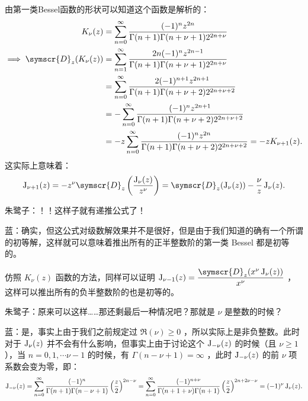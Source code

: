 由第一类Bessel函数的形状可以知道这个函数是解析的：
\[
	\begin{aligned}
		K_{\nu }(z)                           & = \sum_{n=0}^{\infty} \frac{(-1)^nz^{2n}}{\Gamma (n+1)\Gamma (n+\nu +1)2^{2n+\nu }}                        \\
		\implies\symscr{D} _z( K_{\nu }(z)  ) & =
		\sum_{n=1}^{\infty} \frac{2n(-1)^nz^{2n-1}}{\Gamma (n+1)\Gamma (n+\nu +1)2^{2n+\nu }}                                                              \\
		                                      & =	\sum_{n=0}^{\infty} \frac{2(-1)^{n+1} z^{2n+1}}{\Gamma (n+1)\Gamma (n+\nu +2)2^{2n+\nu +2}}               \\
		                                      & =-\sum_{n=0}^{\infty} \frac{(-1)^{n} z^{2n+1}}{\Gamma (n+1)\Gamma (n+\nu +2)2^{2n+\nu +2}}                 \\
		                                      & =-z\sum_{n=0}^{\infty} \frac{(-1)^{n} z^{2n}}{\Gamma (n+1)\Gamma (n+\nu +2)2^{2n+\nu +2}}=-zK_{\nu +1}(z).
	\end{aligned}
\]
这实际上意味着：
\[
	\besselj _{\nu +1}(z) = - z^\nu \symscr{D} _z\left(  \frac{\besselj _{\nu}(z) }{z^\nu } \right) =\symscr{D} _z(\besselj _ \nu (z))- \frac{\nu}{z}\besselj _ \nu (z)
	.\]

朱鹭子：！！这样子就有递推公式了！

蓝：确实，但这公式对级数解效果并不是很好，但是由于我们知道的确有一个所谓的初等解，这样就可以意味着推出所有的正半整数阶的第一类 Bessel 都是初等的。

仿照 \(K_ \nu (z)\) 函数的方法，同样可以证明 \(\besselj _{\nu -1}(z)= \dfrac{\symscr{D} _z(x^\nu \besselj _ \nu (z))}{x^\nu }\) ，这样可以推出所有的负半整数阶的也是初等的。

朱鹭子：原来可以这样……那还剩最后一种情况吧？那就是 \(\nu \) 是整数的时候？

蓝：是，事实上由于我们之前规定过 \(\Re(\nu )\geqslant 0\) ，所以实际上是非负整数。此时对于 \(\operatorname{J} _ \nu (z)\) 并不会有什么影响，但事实上由于讨论这个 \(\operatorname{J} _{-\nu }(z)\) 的时候（且 \(\nu \geqslant 1\)），当 \(n=0,1,\cdots \nu -1\) 的时候，有 \( \Gamma (n-\nu+1 )=\infty\) ，此时 \(\operatorname{J} _{-\nu }(z)\) 的前 \(\nu\) 项系数会变为零，即：
\[
	\operatorname{J} _ {-\nu }(z) = \sum_{n=0 }^{\infty} \frac{(-1)^n}{\Gamma (n+1)\Gamma (n-\nu +1)}\left( \frac{z}{2} \right) ^{2n-\nu } =
	\sum_{n=0}^{\infty} \frac{(-1)^{n+\nu }}{\Gamma (n+1+\nu )\Gamma (n+1)}\left( \frac{z}{2} \right) ^{2n+2\nu -\nu }=(-1)^\nu\operatorname{J} _ \nu (z)
	.\]

